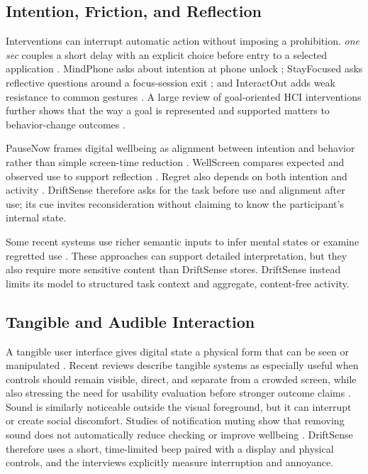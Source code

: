\documentclass[12pt,a4paper]{article}
\newcommand{\citep}[1]{\parencite{#1}}
\begin{document}
\subsection{Intention, Friction, and Reflection}

Interventions can interrupt automatic action without imposing a prohibition. \textit{one sec} couples a short delay with an explicit choice before entry to a selected application \citep{gruning2023onesec}. MindPhone asks about intention at phone unlock \citep{terzimehic2022mindphone}; StayFocused asks reflective questions around a focus-session exit \citep{li2024stayfocused}; and InteractOut adds weak resistance to common gestures \citep{lu2024interactout}. A large review of goal-oriented HCI interventions further shows that the way a goal is represented and supported matters to behavior-change outcomes \citep{zhu2025goals}.

PauseNow frames digital wellbeing as alignment between intention and behavior rather than simple screen-time reduction \citep{zhao2024pausenow}. WellScreen compares expected and observed use to support reflection \citep{bhat2026wellscreen}. Regret also depends on both intention and activity \citep{cho2021reflect}. DriftSense therefore asks for the task before use and alignment after use; its cue invites reconsideration without claiming to know the participant's internal state.

Some recent systems use richer semantic inputs to infer mental states or examine regretted use \citep{wu2024mindshift,guo2025regret}. These approaches can support detailed interpretation, but they also require more sensitive content than DriftSense stores. DriftSense instead limits its model to structured task context and aggregate, content-free activity.

\subsection{Tangible and Audible Interaction}

A tangible user interface gives digital state a physical form that can be seen or manipulated \citep{ishii1997tangible}. Recent reviews describe tangible systems as especially useful when controls should remain visible, direct, and separate from a crowded screen, while also stressing the need for usability evaluation before stronger outcome claims \citep{bertolo2025tangible}. Sound is similarly noticeable outside the visual foreground, but it can interrupt or create social discomfort. Studies of notification muting show that removing sound does not automatically reduce checking or improve wellbeing \citep{liao2022sound,dekker2025buzz}. DriftSense therefore uses a short, time-limited beep paired with a display and physical controls, and the interviews explicitly measure interruption and annoyance.
\end{document}
